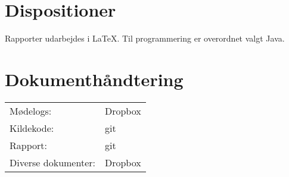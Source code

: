 \section{Dispositioner}
Rapporter udarbejdes i \LaTeX. Til programmering er overordnet valgt Java.

\section{Dokumenthåndtering}
\begin{center}
\begin{tabular}{l l}
	Mødelogs:			& Dropbox \\
	Kildekode:			& git \\
	Rapport:			& git \\
	Diverse dokumenter:	& Dropbox
\end{tabular}
\end{center}
